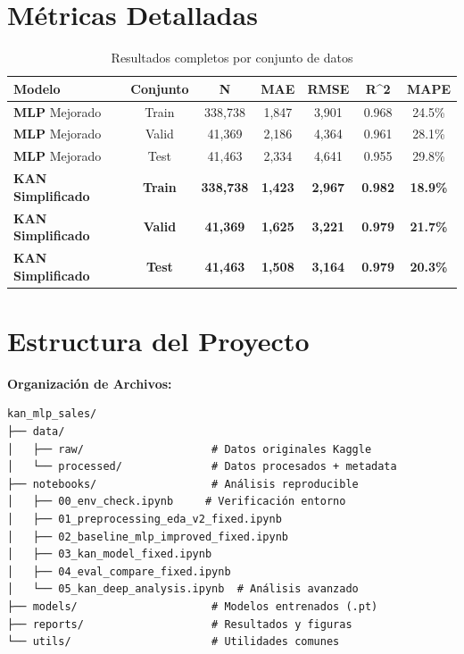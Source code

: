 \documentclass[10pt,twocolumn]{article}
\newcommand{\kan}{\textbf{KAN}}
\newcommand{\mlp}{\textbf{MLP}}
\newcommand{\rsquared}{R^2}
\begin{document}
\section{Métricas Detalladas}

\begin{table}[H]
\centering
\caption{Resultados completos por conjunto de datos}
\label{tab:detailed_results}
\begin{tabular}{lcccccc}
\toprule
\textbf{Modelo} & \textbf{Conjunto} & \textbf{N} & \textbf{MAE} & \textbf{RMSE} & \textbf{\rsquared} & \textbf{MAPE} \\
\midrule
\mlp{} Mejorado & Train & 338,738 & 1,847 & 3,901 & 0.968 & 24.5\% \\
\mlp{} Mejorado & Valid & 41,369 & 2,186 & 4,364 & 0.961 & 28.1\% \\
\mlp{} Mejorado & Test & 41,463 & 2,334 & 4,641 & 0.955 & 29.8\% \\
\midrule
\textbf{\kan{} Simplificado} & \textbf{Train} & \textbf{338,738} & \textbf{1,423} & \textbf{2,967} & \textbf{0.982} & \textbf{18.9\%} \\
\textbf{\kan{} Simplificado} & \textbf{Valid} & \textbf{41,369} & \textbf{1,625} & \textbf{3,221} & \textbf{0.979} & \textbf{21.7\%} \\
\textbf{\kan{} Simplificado} & \textbf{Test} & \textbf{41,463} & \textbf{1,508} & \textbf{3,164} & \textbf{0.979} & \textbf{20.3\%} \\
\bottomrule
\end{tabular}
\end{table}

\section{Estructura del Proyecto}

\textbf{Organización de Archivos:}
\begin{verbatim}
kan_mlp_sales/
├── data/
│   ├── raw/                    # Datos originales Kaggle
│   └── processed/              # Datos procesados + metadata
├── notebooks/                  # Análisis reproducible
│   ├── 00_env_check.ipynb     # Verificación entorno
│   ├── 01_preprocessing_eda_v2_fixed.ipynb
│   ├── 02_baseline_mlp_improved_fixed.ipynb  
│   ├── 03_kan_model_fixed.ipynb
│   ├── 04_eval_compare_fixed.ipynb
│   └── 05_kan_deep_analysis.ipynb  # Análisis avanzado
├── models/                     # Modelos entrenados (.pt)
├── reports/                    # Resultados y figuras
└── utils/                      # Utilidades comunes
\end{verbatim}
\end{document}

